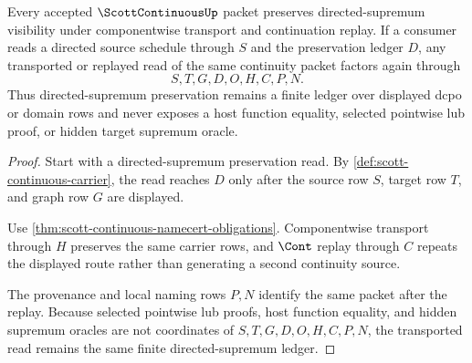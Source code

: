 \begin{theorem}
\label{thm:scott-continuous-directed-sup-stability}
Every accepted $\ScottContinuousUp$ packet preserves directed-supremum visibility under componentwise transport and continuation replay. If a consumer reads a directed source schedule through $S$ and the preservation ledger $D$, any transported or replayed read of the same continuity packet factors again through
$$
S,T,G,D,O,H,C,P,N.
$$
Thus directed-supremum preservation remains a finite ledger over displayed dcpo or domain rows and never exposes a host function equality, selected pointwise lub proof, or hidden target supremum oracle.
\end{theorem}
\begin{proof}
Start with a directed-supremum preservation read. By \autoref{def:scott-continuous-carrier}, the read reaches $D$ only after the source row $S$, target row $T$, and graph row $G$ are displayed.

Use \autoref{thm:scott-continuous-namecert-obligations}. Componentwise transport through $H$ preserves the same carrier rows, and $\Cont$ replay through $C$ repeats the displayed route rather than generating a second continuity source.

The provenance and local naming rows $P,N$ identify the same packet after the replay. Because selected pointwise lub proofs, host function equality, and hidden supremum oracles are not coordinates of $S,T,G,D,O,H,C,P,N$, the transported read remains the same finite directed-supremum ledger.
\end{proof}


